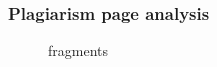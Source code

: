 	


	\subsubsection{Plagiarism page analysis}
	
	 \begin{figure}[!h]
  \centering
  \caption{fragments}
  \label{fig:fragments}
\end{figure}


